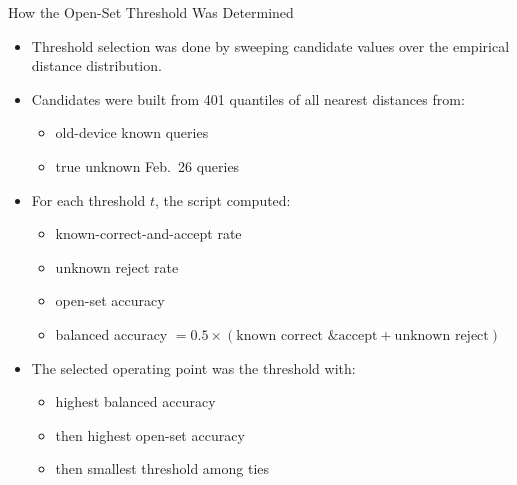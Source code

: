\documentclass[aspectratio=169]{beamer}
\begin{document}
\begin{frame}{How the Open-Set Threshold Was Determined}
  \begin{itemize}
    \item Threshold selection was done by sweeping candidate values over the empirical distance distribution.
    \item Candidates were built from 401 quantiles of all nearest distances from:
    \begin{itemize}
      \item old-device known queries
      \item true unknown Feb.\ 26 queries
    \end{itemize}
    \item For each threshold \(t\), the script computed:
    \begin{itemize}
      \item known-correct-and-accept rate
      \item unknown reject rate
      \item open-set accuracy
      \item balanced accuracy \(= 0.5 \times (\text{known correct \& accept} + \text{unknown reject})\)
    \end{itemize}
    \item The selected operating point was the threshold with:
    \begin{itemize}
      \item highest balanced accuracy
      \item then highest open-set accuracy
      \item then smallest threshold among ties
    \end{itemize}
  \end{itemize}
\end{frame}
\end{document}
